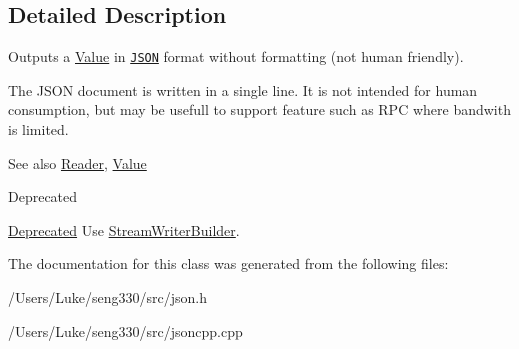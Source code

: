 \subsection{Detailed Description}
Outputs a \hyperlink{class_json_1_1_value}{Value} in \href{http://www.json.org}{\tt J\+S\+O\+N} format without formatting (not human friendly). 

The J\+S\+O\+N document is written in a single line. It is not intended for \textquotesingle{}human\textquotesingle{} consumption, but may be usefull to support feature such as R\+P\+C where bandwith is limited. \begin{DoxySeeAlso}{See also}
\hyperlink{class_json_1_1_reader}{Reader}, \hyperlink{class_json_1_1_value}{Value} 
\end{DoxySeeAlso}
\begin{DoxyRefDesc}{Deprecated}
\item[\hyperlink{deprecated__deprecated000008}{Deprecated}]Use \hyperlink{class_json_1_1_stream_writer_builder}{Stream\+Writer\+Builder}. \end{DoxyRefDesc}


The documentation for this class was generated from the following files\+:\begin{DoxyCompactItemize}
\item 
/\+Users/\+Luke/seng330/src/json.\+h\item 
/\+Users/\+Luke/seng330/src/jsoncpp.\+cpp\end{DoxyCompactItemize}
